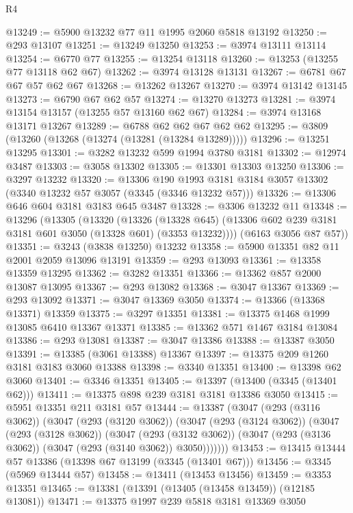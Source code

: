 \begin{lexlean}{R4}
\begin{coremodule}
@13249 := @5900 @13232 @77 @11 @1995 @2060 @5818 @13192
@13250 := @293 @13107
@13251 := @13249 @13250
@13253 := @3974 @13111 @13114
@13254 := @6770 @77
@13255 := @13254 @13118
@13260 := @13253 (@13255 @77 @13118 @62 @67)
@13262 := @3974 @13128 @13131
@13267 := @6781 @67 @67 @57 @62 @67
@13268 := @13262 @13267
@13270 := @3974 @13142 @13145
@13273 := @6790 @67 @62 @57
@13274 := @13270 @13273
@13281 := @3974 @13154 @13157 (@13255 @57 @13160 @62 @67)
@13284 := @3974 @13168 @13171 @13267
@13289 := @6788 @62 @62 @67 @62 @62
@13295 := @3809 (@13260 (@13268 (@13274 (@13281 (@13284 @13289)))))
@13296 := @13251 @13295
@13301 := @3282 @13232 @599 @1994 @3780 @3181
@13302 := @12974 @3487
@13303 := @3058 @13302
@13305 := @13301 @13303 @13250
@13306 := @3297 @13232
@13320 := @13306
    @190
    @1993
    @3181
    @3184
    @3057
    @13302
    (@3340 @13232 @57 @3057 (@3345 (@3346 @13232 @57)))
@13326 := @13306 @646 @604 @3181 @3183 @645 @3487
@13328 := @3306 @13232 @11
@13348 := @13296
    (@13305
      (@13320
        (@13326
          (@13328 @645)
          (@13306 @602 @239 @3181 @3181 @601 @3050 (@13328 @601) (@3353 @13232))))
      (@6163 @3056 @87 @57))
@13351 := @3243 (@3838 @13250) @13232
@13358 := @5900 @13351 @82 @11 @2001 @2059 @13096 @13191
@13359 := @293 @13093
@13361 := @13358 @13359 @13295
@13362 := @3282 @13351
@13366 := @13362 @857 @2000 @13087 @13095
@13367 := @293 @13082
@13368 := @3047 @13367
@13369 := @293 @13092
@13371 := @3047 @13369 @3050
@13374 := @13366 (@13368 @13371) @13359
@13375 := @3297 @13351
@13381 := @13375 @1468 @1999 @13085 @6410 @13367 @13371
@13385 := @13362 @571 @1467 @3184 @13084
@13386 := @293 @13081
@13387 := @3047 @13386
@13388 := @13387 @3050
@13391 := @13385 (@3061 @13388) @13367
@13397 := @13375 @209 @1260 @3181 @3183 @3060 @13388
@13398 := @3340 @13351
@13400 := @13398 @62 @3060
@13401 := @3346 @13351
@13405 := @13397 (@13400 (@3345 (@13401 @62)))
@13411 := @13375 @898 @239 @3181 @3181 @13386 @3050
@13415 := @5951 @13351 @211 @3181 @57
@13444 := @13387
    (@3047
      (@293 (@3116 @3062))
      (@3047
        (@293 (@3120 @3062))
        (@3047
          (@293 (@3124 @3062))
          (@3047
            (@293 (@3128 @3062))
            (@3047
              (@293 (@3132 @3062))
              (@3047 (@293 (@3136 @3062)) (@3047 (@293 (@3140 @3062)) @3050)))))))
@13453 := @13415 @13444 @57 @13386 (@13398 @67 @13199 (@3345 (@13401 @67)))
@13456 := @3345 (@5969 @13444 @57)
@13458 := @13411 (@13453 @13456)
@13459 := @3353 @13351
@13465 := @13381 (@13391 (@13405 (@13458 @13459)) (@12185 @13081))
@13471 := @13375 @1997 @239 @5818 @3181 @13369 @3050

\end{coremodule}
\end{lexlean}
